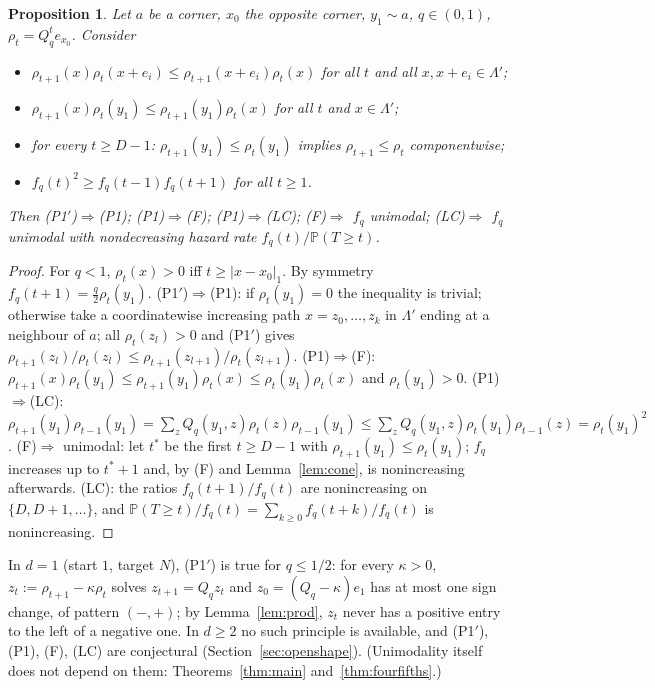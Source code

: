 \documentclass[11pt,a4paper]{article}
\newtheorem{proposition}[theorem]{Proposition}
\theoremstyle{definition}
\newcommand{\Prob}{\mathbb P}
\begin{document}
\begin{proposition}\label{prop:front}
Let $a$ be a corner, $x_0$ the opposite corner, $y_1\sim a$, $q\in(0,1)$, $\rho_t=Q_q^te_{x_0}$. Consider
\begin{itemize}
\item[(P1$'$)] $\rho_{t+1}(x)\rho_t(x+e_i)\le\rho_{t+1}(x+e_i)\rho_t(x)$ for all $t$ and all $x,x+e_i\in\Lambda'$;
\item[(P1)] $\rho_{t+1}(x)\rho_t(y_1)\le\rho_{t+1}(y_1)\rho_t(x)$ for all $t$ and $x\in\Lambda'$;
\item[(F)] for every $t\ge D-1$: $\rho_{t+1}(y_1)\le\rho_t(y_1)$ implies $\rho_{t+1}\le\rho_t$ componentwise;
\item[(LC)] $f_q(t)^2\ge f_q(t-1)f_q(t+1)$ for all $t\ge1$.
\end{itemize}
Then (P1$'$)$\Rightarrow$(P1); (P1)$\Rightarrow$(F); (P1)$\Rightarrow$(LC); (F)$\Rightarrow$ $f_q$ unimodal; (LC)$\Rightarrow$ $f_q$ unimodal with nondecreasing hazard rate $f_q(t)/\Prob(T\ge t)$.
\end{proposition}
\begin{proof}
For $q<1$, $\rho_t(x)>0$ iff $t\ge|x-x_0|_1$. By symmetry $f_q(t+1)=\frac q2\rho_t(y_1)$. (P1$'$)$\Rightarrow$(P1): if $\rho_t(y_1)=0$ the inequality is trivial; otherwise take a coordinatewise increasing path $x=z_0,\dots,z_k$ in $\Lambda'$ ending at a neighbour of $a$; all $\rho_t(z_l)>0$ and (P1$'$) gives $\rho_{t+1}(z_l)/\rho_t(z_l)\le\rho_{t+1}(z_{l+1})/\rho_t(z_{l+1})$. (P1)$\Rightarrow$(F): $\rho_{t+1}(x)\rho_t(y_1)\le\rho_{t+1}(y_1)\rho_t(x)\le\rho_t(y_1)\rho_t(x)$ and $\rho_t(y_1)>0$. (P1)$\Rightarrow$(LC): $\rho_{t+1}(y_1)\rho_{t-1}(y_1)=\sum_zQ_q(y_1,z)\rho_t(z)\rho_{t-1}(y_1)\le\sum_zQ_q(y_1,z)\rho_t(y_1)\rho_{t-1}(z)=\rho_t(y_1)^2$. (F)$\Rightarrow$ unimodal: let $t^*$ be the first $t\ge D-1$ with $\rho_{t+1}(y_1)\le\rho_t(y_1)$; $f_q$ increases up to $t^*+1$ and, by (F) and Lemma~\ref{lem:cone}, is nonincreasing afterwards. (LC): the ratios $f_q(t+1)/f_q(t)$ are nonincreasing on $\{D,D+1,\dots\}$, and $\Prob(T\ge t)/f_q(t)=\sum_{k\ge0}f_q(t+k)/f_q(t)$ is nonincreasing.
\end{proof}

In $d=1$ (start $1$, target $N$), (P1$'$) is true for $q\le1/2$: for every $\kappa>0$, $z_t:=\rho_{t+1}-\kappa\rho_t$ solves $z_{t+1}=Q_qz_t$ and $z_0=(Q_q-\kappa)e_1$ has at most one sign change, of pattern $(-,+)$; by Lemma~\ref{lem:prod}, $z_t$ never has a positive entry to the left of a negative one. In $d\ge2$ no such principle is available, and (P1$'$), (P1), (F), (LC) are conjectural (Section~\ref{sec:openshape}). (Unimodality itself does not depend on them: Theorems~\ref{thm:main} and~\ref{thm:fourfifths}.)
\end{document}
